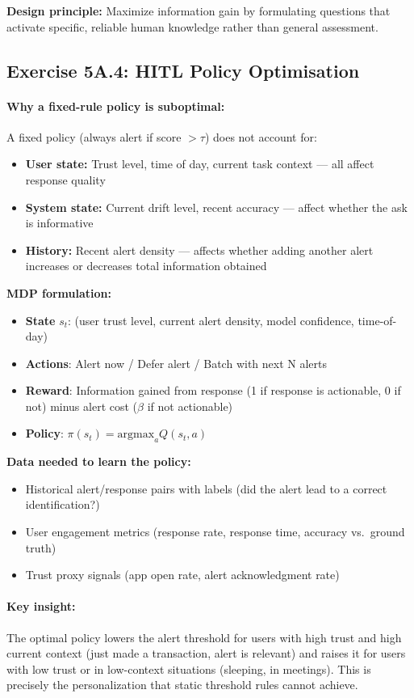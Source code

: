 \textbf{Design principle:} Maximize information gain by formulating questions that activate specific, reliable human knowledge rather than general assessment.

\subsection{Exercise 5A.4: HITL Policy Optimisation}

\paragraph{Why a fixed-rule policy is suboptimal:}

A fixed policy (always alert if score $> \tau$) does not account for:
\begin{itemize}
    \item \textbf{User state:} Trust level, time of day, current task context --- all affect response quality
    \item \textbf{System state:} Current drift level, recent accuracy --- affect whether the ask is informative
    \item \textbf{History:} Recent alert density --- affects whether adding another alert increases or decreases total information obtained
\end{itemize}

\textbf{MDP formulation:}
\begin{itemize}
    \item \textbf{State} $s_t$: (user trust level, current alert density, model confidence, time-of-day)
    \item \textbf{Actions}: Alert now / Defer alert / Batch with next N alerts
    \item \textbf{Reward}: Information gained from response (1 if response is actionable, 0 if not) minus alert cost ($\beta$ if not actionable)
    \item \textbf{Policy}: $\pi(s_t) = \text{argmax}_a Q(s_t, a)$
\end{itemize}

\textbf{Data needed to learn the policy:}
\begin{itemize}
    \item Historical alert/response pairs with labels (did the alert lead to a correct identification?)
    \item User engagement metrics (response rate, response time, accuracy vs.\ ground truth)
    \item Trust proxy signals (app open rate, alert acknowledgment rate)
\end{itemize}

\paragraph{Key insight:} The optimal policy lowers the alert threshold for users with high trust and high current context (just made a transaction, alert is relevant) and raises it for users with low trust or in low-context situations (sleeping, in meetings). This is precisely the personalization that static threshold rules cannot achieve.
